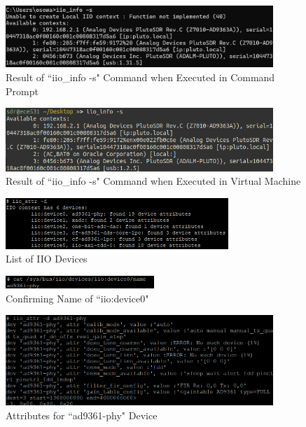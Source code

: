 \documentclass{article}
\begin{document}
\begin{figure}[H]
	\centerline{\includegraphics[width=0.9\textwidth]{iio_info_cmd.png}}
	\caption{Result of ``iio\_info -s" Command when Executed in Command Prompt}
	\label{fig::iio_info_cmd}
\end{figure}

\begin{figure}[H]
	\centerline{\includegraphics[width=0.9\textwidth]{iio_info_vm.png}}
	\caption{Result of ``iio\_info -s" Command when Executed in Virtual Machine}
	\label{fig::iio_info_vm}
\end{figure}

\begin{figure}[H]
	\centerline{\includegraphics[width=0.75\textwidth]{iio_devices.png}}
	\caption{List of IIO Devices}
	\label{fig::iio_devices}
\end{figure}

\begin{figure}[H]
	\centerline{\includegraphics[width=0.5\textwidth]{iio_device0_name.png}}
	\caption{Confirming Name of ``iio:device0"}
	\label{fig::iio_device0_name}
\end{figure}

\begin{figure}[H]
	\centerline{\includegraphics[width=0.9\textwidth]{iio_raw_attributes.png}}
	\caption{Attributes for ``ad9361-phy" Device}
	\label{fig::iio_raw_attributes}
\end{figure}
\end{document}

